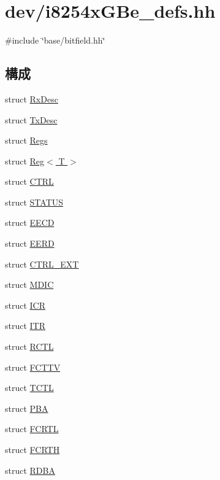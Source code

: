\hypertarget{i8254xGBe__defs_8hh}{
\section{dev/i8254xGBe\_\-defs.hh}
\label{i8254xGBe__defs_8hh}
}
{\ttfamily \#include \char`\"{}base/bitfield.hh\char`\"{}}\par
\subsection*{構成}
\begin{DoxyCompactItemize}
\item 
struct \hyperlink{structiGbReg_1_1RxDesc}{RxDesc}
\item 
struct \hyperlink{structiGbReg_1_1TxDesc}{TxDesc}
\item 
struct \hyperlink{structiGbReg_1_1Regs}{Regs}
\item 
struct \hyperlink{structiGbReg_1_1Regs_1_1Reg}{Reg$<$ T $>$}
\item 
struct \hyperlink{structiGbReg_1_1Regs_1_1CTRL}{CTRL}
\item 
struct \hyperlink{structiGbReg_1_1Regs_1_1STATUS}{STATUS}
\item 
struct \hyperlink{structiGbReg_1_1Regs_1_1EECD}{EECD}
\item 
struct \hyperlink{structiGbReg_1_1Regs_1_1EERD}{EERD}
\item 
struct \hyperlink{structiGbReg_1_1Regs_1_1CTRL__EXT}{CTRL\_\-EXT}
\item 
struct \hyperlink{structiGbReg_1_1Regs_1_1MDIC}{MDIC}
\item 
struct \hyperlink{structiGbReg_1_1Regs_1_1ICR}{ICR}
\item 
struct \hyperlink{structiGbReg_1_1Regs_1_1ITR}{ITR}
\item 
struct \hyperlink{structiGbReg_1_1Regs_1_1RCTL}{RCTL}
\item 
struct \hyperlink{structiGbReg_1_1Regs_1_1FCTTV}{FCTTV}
\item 
struct \hyperlink{structiGbReg_1_1Regs_1_1TCTL}{TCTL}
\item 
struct \hyperlink{structiGbReg_1_1Regs_1_1PBA}{PBA}
\item 
struct \hyperlink{structiGbReg_1_1Regs_1_1FCRTL}{FCRTL}
\item 
struct \hyperlink{structiGbReg_1_1Regs_1_1FCRTH}{FCRTH}
\item 
struct \hyperlink{structiGbReg_1_1Regs_1_1RDBA}{RDBA}
\item 

\end{DoxyCompactItemize}
